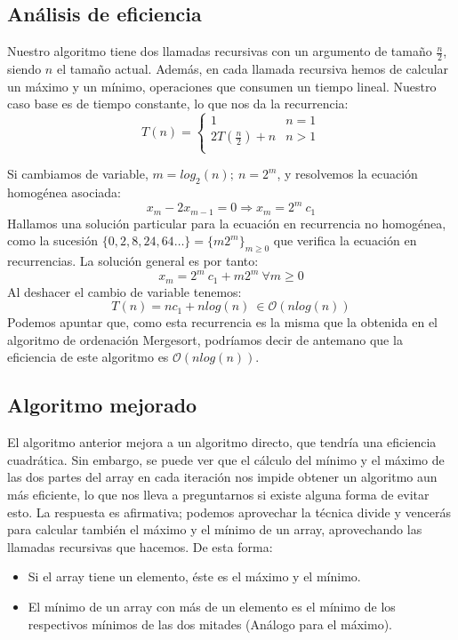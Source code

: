 \documentclass[a4paper, 11pt]{article} %
\begin{document}
\subsection{Análisis de eficiencia}
Nuestro algoritmo tiene dos llamadas recursivas con un argumento de tamaño $\frac{n}{2}$, siendo $n$ el tamaño actual. Además, en cada llamada recursiva hemos de calcular un máximo y un mínimo, operaciones que consumen un tiempo lineal. Nuestro caso base es de tiempo constante, lo que nos da la recurrencia: 
\begin{equation}
T(n)=\left\lbrace
	    \begin{array}{lr}
            1 & n=1\\
            2T\left(\frac{n}{2}\right) + n & n>1\\
            \end{array}
	    \right.
\end{equation}

Si cambiamos de variable, $m = log_2(n);\ n = 2^m$, y resolvemos la ecuación homogénea asociada:
$$ x_m-2x_{m-1}=0 \Rightarrow x_m = 2^m\ c_1 $$
Hallamos una solución particular para la ecuación en recurrencia no homogénea, como la sucesión $\{0, 2, 8, 24, 64\dots\}=\{m2^{m}\}_{m\ge 0}$ que verifica la ecuación en recurrencias. La solución general es por tanto:
$$ x_m = 2^m\ c_1 + m2^{m}\ \forall m\ge 0$$
Al deshacer el cambio de variable tenemos:
$$ T(n) = nc_1 + nlog(n)\ \in \mathcal{O}(nlog(n))$$
Podemos apuntar que, como esta recurrencia es la misma que la obtenida en el algoritmo de ordenación Mergesort, podríamos decir de antemano que la eficiencia de este algoritmo es $\mathcal{O}(n log(n))$.

\subsection{Algoritmo mejorado}

	El algoritmo anterior mejora a un algoritmo directo, que tendría una eficiencia cuadrática. Sin embargo, se puede ver que el cálculo del mínimo y el máximo de las dos partes del array en cada iteración nos impide obtener un algoritmo aun más eficiente, lo que nos lleva a preguntarnos si existe alguna forma de evitar esto. La respuesta es afirmativa; podemos aprovechar la técnica divide y vencerás para calcular también el máximo y el mínimo de un array, aprovechando las llamadas recursivas que hacemos. De esta forma: 
	
	\begin{itemize}
		\item Si el array tiene un elemento, éste es el máximo y el mínimo.
		\item El mínimo de un array con más de un elemento es el mínimo de los respectivos mínimos de las dos mitades (Análogo para el máximo).
	\end{itemize}
	
\end{document}
